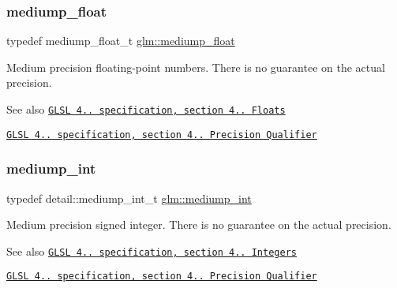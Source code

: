 \subsubsection{\texorpdfstring{mediump\+\_\+float}{mediump\_float}}
{\footnotesize\ttfamily typedef mediump\+\_\+float\+\_\+t \hyperlink{group__core__precision_gac785826c039fe6c97c03b37c81c1a68e}{glm\+::mediump\+\_\+float}}

Medium precision floating-\/point numbers. There is no guarantee on the actual precision.

\begin{DoxySeeAlso}{See also}
\href{http://www.opengl.org/registry/doc/GLSLangSpec.4.20.8.pdf}{\tt G\+L\+SL 4.. specification, section 4.. Floats} 

\href{http://www.opengl.org/registry/doc/GLSLangSpec.4.20.8.pdf}{\tt G\+L\+SL 4.. specification, section 4.. Precision Qualifier} 
\end{DoxySeeAlso}
\mbox{\label{group__core__precision_ga2a3dcbcd7f4e17663d393a12061ac6ac}} 
\subsubsection{\texorpdfstring{mediump\+\_\+int}{mediump\_int}}
{\footnotesize\ttfamily typedef detail\+::mediump\+\_\+int\+\_\+t \hyperlink{group__core__precision_ga2a3dcbcd7f4e17663d393a12061ac6ac}{glm\+::mediump\+\_\+int}}

Medium precision signed integer. There is no guarantee on the actual precision.

\begin{DoxySeeAlso}{See also}
\href{http://www.opengl.org/registry/doc/GLSLangSpec.4.20.8.pdf}{\tt G\+L\+SL 4.. specification, section 4.. Integers} 

\href{http://www.opengl.org/registry/doc/GLSLangSpec.4.20.8.pdf}{\tt G\+L\+SL 4.. specification, section 4.. Precision Qualifier} 
\end{DoxySeeAlso}
\mbox{\label{group__core__precision_ga38b24c06ac0dfe4dcfbe7abf9a93dbb4}} 
